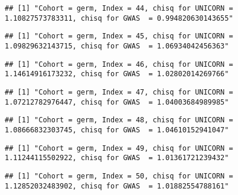 \documentclass[]{article}
\begin{document}
\begin{verbatim}
## [1] "Cohort = germ, Index = 44, chisq for UNICORN = 1.10827573783311, chisq for GWAS  = 0.994820630143655"
\end{verbatim}

\begin{verbatim}
## [1] "Cohort = germ, Index = 45, chisq for UNICORN = 1.09829632143715, chisq for GWAS  = 1.06934042456363"
\end{verbatim}

\begin{verbatim}
## [1] "Cohort = germ, Index = 46, chisq for UNICORN = 1.14614916173232, chisq for GWAS  = 1.02802014269766"
\end{verbatim}

\begin{verbatim}
## [1] "Cohort = germ, Index = 47, chisq for UNICORN = 1.07212782976447, chisq for GWAS  = 1.04003684989985"
\end{verbatim}

\begin{verbatim}
## [1] "Cohort = germ, Index = 48, chisq for UNICORN = 1.08666832303745, chisq for GWAS  = 1.04610152941047"
\end{verbatim}

\begin{verbatim}
## [1] "Cohort = germ, Index = 49, chisq for UNICORN = 1.11244115502922, chisq for GWAS  = 1.01361721239432"
\end{verbatim}

\begin{verbatim}
## [1] "Cohort = germ, Index = 50, chisq for UNICORN = 1.12852032483902, chisq for GWAS  = 1.01882554788161"
\end{verbatim}
\end{document}
